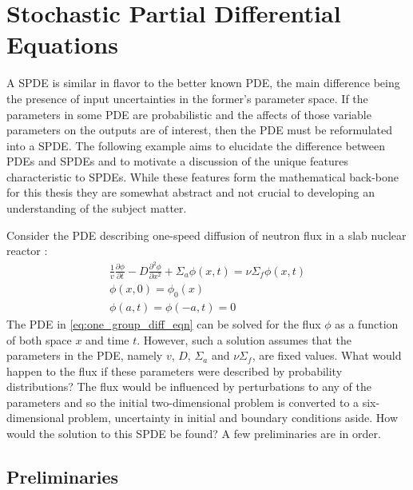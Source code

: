 \section{Stochastic Partial Differential Equations} \label{sec:spdes}

A \ac{SPDE} is similar in flavor to the better known \ac{PDE}, the main difference being the presence of input uncertainties in the former's parameter space. If the parameters in some \ac{PDE} are probabilistic and the affects of those variable parameters on the outputs are of interest, then the \ac{PDE} must be reformulated into a \ac{SPDE}. The following example aims to elucidate the difference between \ac{PDE}s and \ac{SPDE}s and to motivate a discussion of the unique features characteristic to \ac{SPDE}s. While these features form the mathematical back-bone for this thesis they are somewhat abstract and not crucial to developing an understanding of the subject matter. 

Consider the \ac{PDE} describing one-speed diffusion of neutron flux in a slab nuclear reactor \cite{Duderstadt}:
\begin{eqnarray} \label{eq:one_group_diff_eqn} 
   \frac{1}{v} \frac{\partial\phi}{\partial t} 
    - D	\frac{\partial^2\phi}{\partial x^2}
     + \Sigma_{a}\phi(x,t)
      = \nu\Sigma_{f}\phi(x,t) \\
   \phi(x,0) = \phi_{0}(x) \nonumber \\
   \phi(a,t) = \phi(-a,t) = 0 \nonumber
\end{eqnarray}
The \ac{PDE} in \ref{eq:one_group_diff_eqn} can be solved for the flux $\phi$ as a function of both space $x$ and time $t$. However, such a solution assumes that the parameters in the \ac{PDE}, namely $v$, $D$, $\Sigma_a$ and $\nu\Sigma_f$, are fixed values. What would happen to the flux if these parameters were described by probability distributions? The flux would be influenced by perturbations to any of the parameters and so the initial two-dimensional problem is converted to a six-dimensional problem, uncertainty in initial and boundary conditions aside. How would the solution to this \ac{SPDE} be found? A few preliminaries are in order.

\subsection{Preliminaries} \label{subsec:SPDEs_prelims}

